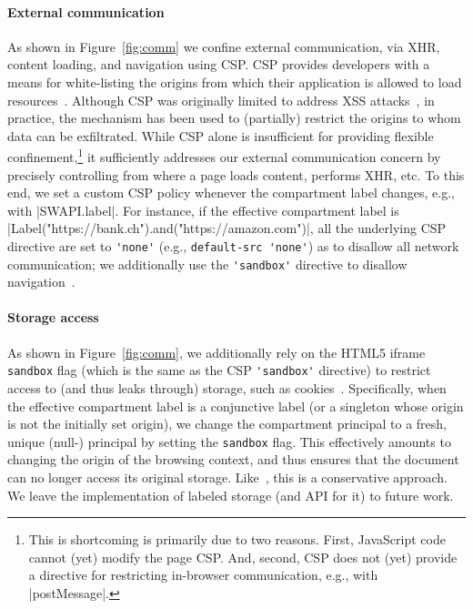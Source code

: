  
\paragraph{External communication}
%
As shown in Figure~\ref{fig:comm} we confine external communication,
via XHR, content loading, and navigation using CSP.
%
CSP provides developers with a
means for white-listing the origins from which their application is
allowed to load resources~\cite{csp}.
%
Although CSP was originally limited to address XSS
attacks~\cite{kerschbaum2007simple}, in practice, the mechanism has
been used to (partially) restrict the origins to whom data can be
exfiltrated.
%
While CSP alone is insufficient for providing flexible
confinement,\footnote{
This is shortcoming is primarily due to two reasons. First,
JavaScript code cannot (yet) modify the page CSP.
And, second, CSP does not (yet) provide a directive for restricting 
in-browser communication, e.g., with \js|postMessage|.
}
it sufficiently addresses our external communication concern by
precisely controlling from where a page loads content, performs XHR, etc.
%
To this end, we set a custom CSP policy whenever the compartment label
changes, e.g., with \js|SWAPI.label|.
%
For instance, if the effective compartment label is
\js|Label("https://bank.ch").and("https://amazon.com")|, all the
underlying CSP directive are set to \verb|'none'| (e.g.,
\verb|default-src 'none'|) as to disallow all network communication;
we additionally use the \verb|'sandbox'| directive to disallow
navigation~\cite{csp1.1,whatwg-html,html5}.
%

\paragraph{Storage access}
As shown in Figure~\ref{fig:comm}, we additionally rely on the HTML5
iframe \verb|sandbox| flag (which is the same as the CSP
\verb|'sandbox'| directive) to restrict access to (and thus leaks
through) storage, such as cookies~\cite{html5}.
%
Specifically, when the effective compartment label is a conjunctive
label (or a singleton whose origin is not the initially set origin),
we change the compartment principal to a fresh, unique (null-)
principal by setting the \verb|sandbox| flag.
%
This effectively amounts to changing the origin of the browsing
context, and thus ensures that the document can no longer access its
original storage.
%
Like~\cite{Akhawe2013}, this is a conservative approach.
%
We leave the implementation of labeled storage (and API for it) to
future work.


